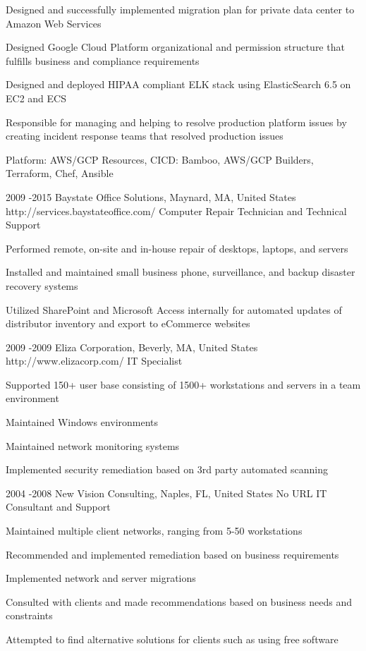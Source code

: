 \documentclass[10pt]{article} %
\begin{document}
{\begin{itemize-noindent}
\item{Designed and successfully implemented migration plan for private data center to Amazon Web Services}
\item{Designed Google Cloud Platform organizational and permission structure that fulfills business and compliance requirements}
\item{Designed and deployed HIPAA compliant ELK stack using ElasticSearch 6.5 on EC2 and ECS}
\item{Responsible for managing and helping to resolve production platform issues by creating incident response teams that resolved production issues}
\item{Platform: AWS/GCP Resources, CICD: Bamboo, AWS/GCP Builders, Terraform, Chef, Ansible}
\end{itemize-noindent}}
\newpage
\job
{2009 -}{2015}
{Baystate Office Solutions, Maynard, MA, United States}
{http://services.baystateoffice.com/}
{Computer Repair Technician and Technical Support}
{\begin{itemize-noindent}
\item{Performed remote, on-site and in-house repair of desktops, laptops, and servers}
\item{Installed and maintained small business phone, surveillance, and backup disaster recovery systems}
\item{Utilized SharePoint and Microsoft Access internally for automated updates of distributor inventory and export to eCommerce websites}
\end{itemize-noindent}}
\job
{2009 -}{2009}
{Eliza Corporation, Beverly, MA, United States}
{http://www.elizacorp.com/}
{IT Specialist}
{\begin{itemize-noindent}
\item{Supported 150+ user base consisting of 1500+ workstations and servers in a team environment}
\item{Maintained Windows environments}
\item{Maintained network monitoring systems}
\item{Implemented security remediation based on 3rd party automated scanning}
\end{itemize-noindent}}
\job
{2004 -}{2008}
{New Vision Consulting, Naples, FL, United States}
{No URL}
{IT Consultant and Support}
{\begin{itemize-noindent}
\item{Maintained multiple client networks, ranging from 5-50 workstations}
\item{Recommended and implemented remediation based on business requirements}
\item{Implemented network and server migrations}
\item{Consulted with clients and made recommendations based on business needs and constraints}
\item{Attempted to find alternative solutions for clients such as using free software}
\end{itemize-noindent}}
\end{document}
